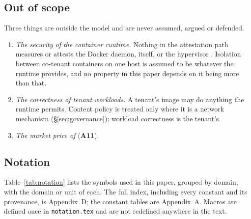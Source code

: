 \subsection{Out of scope}
\label{sec:model:scope}

Three things are outside the model and are never assumed, argued or defended.
\begin{enumerate}
  \item \emph{The security of the container runtime.} Nothing in the attestation path measures or
        attests the Docker daemon, \FluxOS{} itself, or the hypervisor
        . Isolation between co-tenant containers on one
        host is assumed to be whatever the runtime provides, and no property in this paper depends on
        it being more than that.
  \item \emph{The correctness of tenant workloads.} A tenant's image may do anything the runtime
        permits. Content policy is treated only where it is a network mechanism
        (\S\ref{sec:governance}); workload correctness is the tenant's.
  \item \emph{The market price of \flux{}} (\textbf{A11}).
\end{enumerate}

\subsection{Notation}
\label{sec:model:notation}

Table~\ref{tab:notation} lists the symbols used in this paper, grouped by domain, with the domain or
unit of each. The full index, including every constant and its provenance, is Appendix~D; the
constant tables are Appendix~A. Macros are defined once in \texttt{notation.tex} and are not
redefined anywhere in the text.

